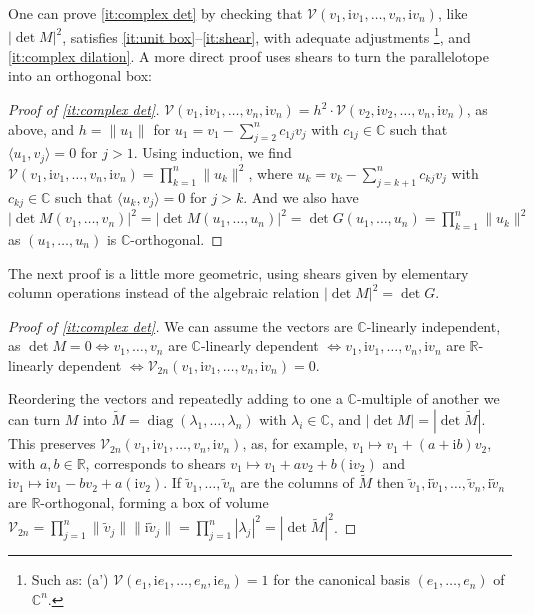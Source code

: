 \documentclass{birkjour}
\newcommand{\OMIT}[1]{\todo[color=gray!30]{#1}}  %
\theoremstyle{definition}
\def\R			{\mathds{R}}
\def\C			{\mathds{C}}
\def\VV			{\mathcal{V}}
\def\im	 					{\mathrm{i}}				%
\newcommand\inner[1] 		{\langle #1 \rangle}		%
\DeclareMathOperator{\Span}{span}
\DeclareMathOperator{\diag}{diag}
\begin{document}
One can prove \ref{it:complex det} by checking that
$\VV(v_1,\im v_1,\ldots,v_n,\im v_n)$, like $|\det M|^2$, satisfies
\ref{it:unit box}--\ref{it:shear}, with adequate adjustments%
	\footnote{Such as: (a') $\VV(e_1,\im e_1,\ldots,e_n,\im e_n) = 1$ for the canonical basis $(e_1,\ldots,e_n)$ of $\C^n$.},
and \ref{it:complex dilation}.
A more direct proof uses shears to turn the parallelotope into an orthogonal box:


\begin{proof}[Proof of \ref{it:complex det}]
	$\VV(v_1,\im v_1,\ldots,v_n,\im v_n) = h^2 \cdot \VV(v_2,\im v_2,\ldots,v_n,\im v_n)$, as above, and $h=\|u_1\|$ for $u_1=v_1-\sum_{j=2}^n c_{1j} v_j$ with $c_{1j}\in \C$ such that $\inner{u_1,v_j} = 0$ for $j > 1$.
	Using induction, we find 
	$\VV(v_1,\im v_1,\ldots,v_n,\im v_n) = \prod_{k=1}^n \|u_k\|^2$, where $u_k = v_k-\sum_{j=k+1}^n c_{kj} v_j$ with $c_{kj}\in \C$ such that $\inner{u_k,v_j} = 0$ for $j > k$.
	And we also have 
	$|\det M(v_1,\ldots,v_n)|^2 = |\det M(u_1,\ldots,u_n)|^2 = 
	\det G(u_1,\ldots,u_n) = \prod_{k=1}^n \|u_k\|^2$
	as $(u_1,\ldots,u_n)$ is $\C$-orthogonal.
\end{proof}

The next proof is a little more geometric, using shears given by elementary column operations instead of the algebraic relation $|\det M|^2 = \det G$.

\begin{proof}[Proof of \ref{it:complex det}]	
	We can assume the vectors are $\C$-linearly independent, as
	$\det M = 0 \Leftrightarrow v_1,\ldots,v_n$ are $\C$-linearly dependent $\Leftrightarrow v_1,\im v_1,\ldots,v_n,\im v_n$ are $\R$-linearly dependent $\Leftrightarrow 
	\VV_{2n}(v_1,\im v_1,\ldots,v_n,\im v_n) = 0$.
	
	Reordering the vectors and repeatedly adding to one a $\C$-multiple of another
		\OMIT{as in a Gaussian elimination}
	we can turn $M$ into  
	$\tilde{M} = \diag(\lambda_1,\ldots,\lambda_n)$ with 
	$\lambda_i \in \C$, and 
	$|\det M| = |\det \tilde{M}|$. 
	This preserves $\VV_{2n}(v_1,\im v_1,\ldots,v_n,\im v_n)$, as, for example, $v_1 \mapsto v_1 + (a+\im b) v_2$, with $a,b\in \R$, corresponds to shears $v_1 \mapsto v_1 + a v_2 + b (\im v_2)$ and $\im v_1 \mapsto \im v_1 - b v_2 + a (\im v_2)$.
	If $\tilde{v}_1,\ldots,\tilde{v}_n$ are the columns of $\tilde{M}$ then $\tilde{v}_1,\im \tilde{v}_1, \ldots,\tilde{v}_n, \im \tilde{v}_n$ are $\R$-orthogonal, forming a box of volume $\VV_{2n} = \prod_{j=1}^n \|\tilde{v}_j\| \|\im \tilde{v}_j\| = \prod_{j=1}^n |\lambda_j|^2 = |\det \tilde{M}|^2$.
\end{proof}
\end{document}
